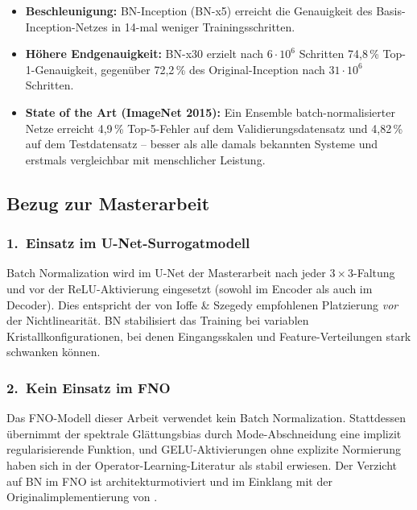 \documentclass[a4paper,12pt]{article}
\begin{document}
\begin{itemize}
  \item \textbf{Beschleunigung:} BN-Inception (BN-x5) erreicht die Genauigkeit
    des Basis-Inception-Netzes in 14-mal weniger Trainingsschritten.

  \item \textbf{H\"ohere Endgenauigkeit:} BN-x30 erzielt nach $6\cdot10^6$
    Schritten 74{,}8\,\% Top-1-Genauigkeit, gegen\"uber 72{,}2\,\% des
    Original-Inception nach $31\cdot10^6$ Schritten.

  \item \textbf{State of the Art (ImageNet 2015):} Ein Ensemble batch-normalisierter
    Netze erreicht 4{,}9\,\% Top-5-Fehler auf dem Validierungsdatensatz und
    4{,}82\,\% auf dem Testdatensatz -- besser als alle damals bekannten
    Systeme und erstmals vergleichbar mit menschlicher Leistung.
\end{itemize}

\subsection*{Bezug zur Masterarbeit}

\subsubsection*{1.\ Einsatz im U-Net-Surrogatmodell}

Batch Normalization wird im U-Net der Masterarbeit nach jeder $3\times3$-Faltung
und vor der ReLU-Aktivierung eingesetzt (sowohl im Encoder als auch im Decoder).
Dies entspricht der von Ioffe \& Szegedy empfohlenen Platzierung \emph{vor} der
Nichtlinearit\"at. BN stabilisiert das Training bei variablen Kristallkonfigurationen,
bei denen Eingangsskalen und Feature-Verteilungen stark schwanken k\"onnen.

\subsubsection*{2.\ Kein Einsatz im FNO}

Das FNO-Modell dieser Arbeit verwendet kein Batch Normalization. Stattdessen
\"ubernimmt der spektrale Gl\"attungsbias durch Mode-Abschneidung eine implizit
regularisierende Funktion, und GELU-Aktivierungen ohne explizite Normierung
haben sich in der Operator-Learning-Literatur als stabil erwiesen. Der Verzicht
auf BN im FNO ist architekturmotiviert und im Einklang mit der Originalimplementierung
von \textcite*{li_fourier_2021}.
\end{document}
